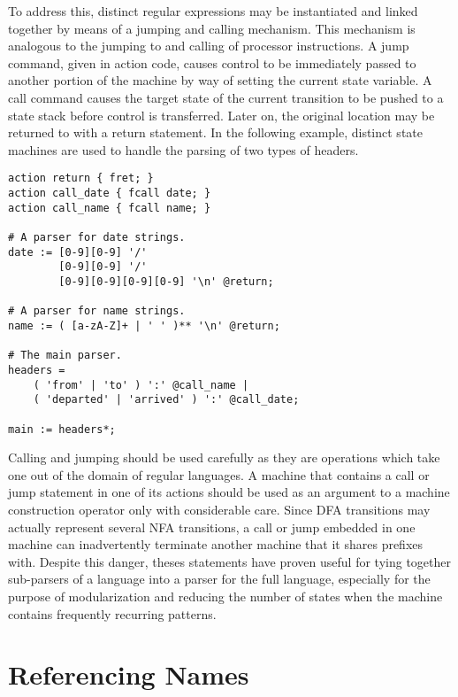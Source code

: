 \documentclass[letterpaper,11pt,oneside]{book}
\newenvironment{inline_code}{\def\baselinestretch{1}\vspace{12pt}\small}{}
\begin{document}
To address this, distinct regular expressions may be instantiated and linked
together by means of a jumping and calling mechanism. This mechanism is
analogous to the jumping to and calling of processor instructions. A jump
command, given in action code, causes control to be immediately passed to
another portion of the machine by way of setting the current state variable. A
call command causes the target state of the current transition to be pushed to
a state stack before control is transferred.  Later on, the original location
may be returned to with a return statement. In the following example, distinct
state machines are used to handle the parsing of two types of headers.

\begin{inline_code}
\begin{verbatim}
action return { fret; }
action call_date { fcall date; }
action call_name { fcall name; }

# A parser for date strings.
date := [0-9][0-9] '/' 
        [0-9][0-9] '/' 
        [0-9][0-9][0-9][0-9] '\n' @return;

# A parser for name strings.
name := ( [a-zA-Z]+ | ' ' )** '\n' @return;

# The main parser.
headers = 
    ( 'from' | 'to' ) ':' @call_name | 
    ( 'departed' | 'arrived' ) ':' @call_date;

main := headers*;
\end{verbatim}
\end{inline_code}

Calling and jumping should be used carefully as they are operations which take
one out of the domain
of regular languages. A machine that contains a call or jump statement in one
of its actions should be used as an argument to a machine construction operator
only with considerable care. Since DFA transitions may actually
represent several NFA transitions, a call or jump embedded in one machine can
inadvertently terminate another machine that it shares prefixes with. Despite
this danger, theses statements have proven useful for tying together
sub-parsers of a language into a parser for the full language, especially for
the purpose of modularization and reducing the number of states when the
machine contains frequently recurring patterns.
\section{Referencing Names}
\label{labels}
\end{document}

